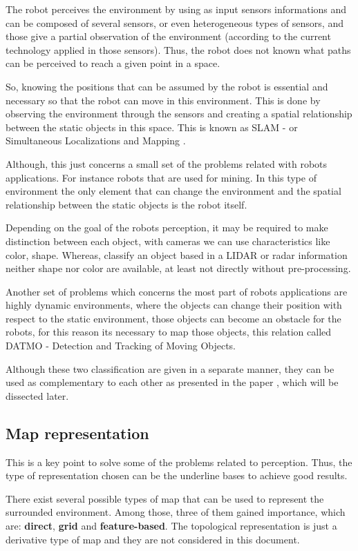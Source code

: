 The robot perceives the environment by using as input sensors informations and can be composed of several sensors, or even heterogeneous types of sensors, and those give a partial observation of the environment (according to the current technology applied in those sensors). Thus, the robot does not known what paths can be perceived to reach a given point in a space.

So, knowing the positions that can be assumed by the robot is essential and necessary so that the robot can move in this environment. This is done by observing the environment through the sensors and creating a spatial relationship between the static objects in this space. This is known as SLAM - or Simultaneous Localizations and Mapping \cite{iyengar1991autonomous}.

Although, this just concerns a small set of the problems related with robots applications. For instance robots that are used for mining. In this type of environment the only element that can change the environment and the spatial relationship between the static objects is the robot itself. 

Depending on the goal of the robots perception, it may be required to make distinction between each object, with cameras we can use characteristics like color, shape. Whereas, classify an object based in a LIDAR or radar information neither shape nor color are available, at least not directly without pre-processing.

Another set of problems which concerns the most part of robots applications are highly dynamic environments, where the objects can change their position with respect to the static environment, those objects can become an obstacle for the robots, for this reason its necessary to map those objects, this relation called DATMO - Detection and Tracking of Moving Objects.

Although these two classification are given in a separate manner, they can be used as complementary to each other as presented in the paper \cite{Wang04a}, which will be dissected later.

\subsection{Map representation}

This is a key point to solve some of the problems related to perception. Thus, the type of representation chosen can be the underline bases to achieve good results.

There exist several possible types of map that can be used to represent the surrounded environment. Among those, three of them gained importance, which are: \textbf{direct}, \textbf{grid} and \textbf{feature-based}\cite{Wang04a}. The topological representation is just a derivative type of map and they are not considered in this document.

